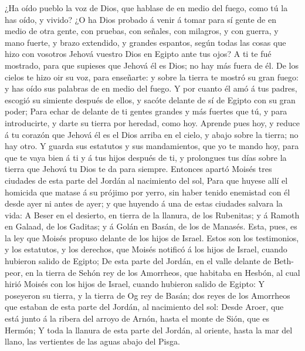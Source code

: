  ¿Ha oído pueblo la voz de Dios, que hablase de en medio
del fuego, como tú la has oído, y vivido?  ¿O ha Dios
probado á venir á tomar para sí gente de en medio de otra gente, con
pruebas, con señales, con milagros, y con guerra, y mano fuerte, y brazo
extendido, y grandes espantos, según todas las cosas que hizo con
vosotros Jehová vuestro Dios en Egipto ante tus ojos?  A ti
te fué mostrado, para que supieses que Jehová él es Dios; no hay más
fuera de él.  De los cielos te hizo oir su voz, para
enseñarte: y sobre la tierra te mostró su gran fuego: y has oído sus
palabras de en medio del fuego.  Y por cuanto él amó á tus
padres, escogió su simiente después de ellos, y sacóte delante de sí de
Egipto con su gran poder;  Para echar de delante de ti
gentes grandes y más fuertes que tú, y para introducirte, y darte su
tierra por heredad, como hoy.  Aprende pues hoy, y reduce á
tu corazón que Jehová él es el Dios arriba en el cielo, y abajo sobre la
tierra; no hay otro.  Y guarda sus estatutos y sus
mandamientos, que yo te mando hoy, para que te vaya bien á ti y á tus
hijos después de ti, y prolongues tus días sobre la tierra que Jehová tu
Dios te da para siempre.  Entonces apartó Moisés tres
ciudades de esta parte del Jordán al nacimiento del sol, 
Para que huyese allí el homicida que matase á su prójimo por yerro, sin
haber tenido enemistad con él desde ayer ni antes de ayer; y que huyendo
á una de estas ciudades salvara la vida:  A Beser en el
desierto, en tierra de la llanura, de los Rubenitas; y á Ramoth en
Galaad, de los Gaditas; y á Golán en Basán, de los de Manasés.
 Esta, pues, es la ley que Moisés propuso delante de los
hijos de Israel.  Estos son los testimonios, y los
estatutos, y los derechos, que Moisés notificó á los hijos de Israel,
cuando hubieron salido de Egipto;  De esta parte del
Jordán, en el valle delante de Beth-peor, en la tierra de Sehón rey de
los Amorrheos, que habitaba en Hesbón, al cual hirió Moisés con los
hijos de Israel, cuando hubieron salido de Egipto:  Y
poseyeron su tierra, y la tierra de Og rey de Basán; dos reyes de los
Amorrheos que estaban de esta parte del Jordán, al nacimiento del sol:
 Desde Aroer, que está junto á la ribera del arroyo de
Arnón, hasta el monte de Sión, que es Hermón;  Y toda la
llanura de esta parte del Jordán, al oriente, hasta la mar del llano,
las vertientes de las aguas abajo del Pisga.

